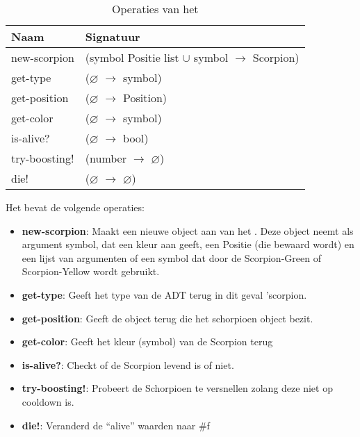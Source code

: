 \begin{table}[hbt]
\centering
\begin{tabular}{|ll|}
\hline
\rowcolor[HTML]{000000} 
{\color[HTML]{FFFFFF} \textbf{Naam}} & {\color[HTML]{FFFFFF} \textbf{Signatuur}} \\ \hline
new-scorpion    & (symbol Positie list $\cup$ symbol $\rightarrow$ Scorpion) \\ \hline
get-type      & ($\varnothing$ $\rightarrow$ symbol)                        \\ \hline
get-position  & ($\varnothing$ $\rightarrow$ Position)                        \\ \hline
get-color  & ($\varnothing$ $\rightarrow$ symbol)                        \\ \hline
is-alive?  & ($\varnothing$ $\rightarrow$ bool)                        \\ \hline
try-boosting!                    & (number $\rightarrow$ $\varnothing$)                                       \\ \hline
die!                                 & ($\varnothing$ $\rightarrow$ $\varnothing$)                                       \\ \hline
\end{tabular}
\caption{Operaties van het \texttt{}}
\label{table:scorpion}
\end{table}

Het \texttt{} bevat de volgende operaties:

\begin{itemize}
	\item \textbf{new-scorpion}: Maakt een nieuwe object aan van het \texttt{}.
		Deze object neemt als argument symbol, dat een kleur aan geeft,
		een Positie (die bewaard wordt)
		en een lijst van argumenten of een symbol dat door de Scorpion-Green of Scorpion-Yellow wordt gebruikt.
	\item \textbf{get-type}: Geeft het type van de ADT terug in dit geval 'scorpion.
	\item \textbf{get-position}: Geeft de \texttt{} object terug die het schorpioen object bezit.
	\item \textbf{get-color}: Geeft het kleur (symbol) van de Scorpion terug
	\item \textbf{is-alive?}: Checkt of de Scorpion levend is of niet.
	\item \textbf{try-boosting!}: Probeert de Schorpioen te versnellen zolang deze niet op cooldown is.
	\item \textbf{die!}: Veranderd de ``alive'' waarden naar \#f
\end{itemize}

